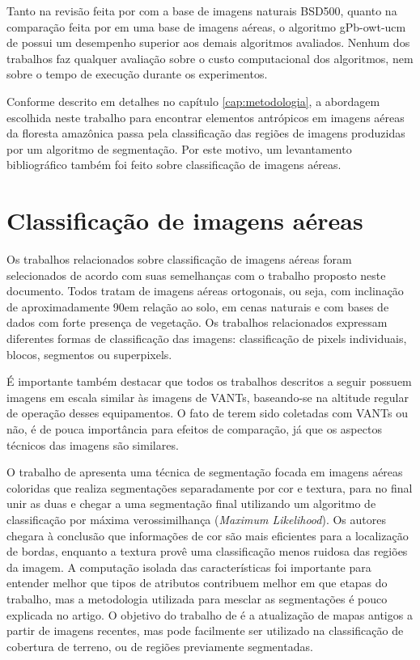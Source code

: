 Tanto na revisão feita por  com a base de imagens naturais BSD500, quanto na comparação feita por  em uma base de imagens aéreas, o algoritmo gPb-owt-ucm de  possui um desempenho superior aos demais algoritmos avaliados. Nenhum dos trabalhos faz qualquer avaliação sobre o custo computacional dos algoritmos, nem sobre o tempo de execução durante os experimentos.

Conforme descrito em detalhes no capítulo \ref{cap:metodologia}, a abordagem escolhida neste trabalho para encontrar elementos antrópicos em imagens aéreas da floresta amazônica passa pela classificação das regiões de imagens produzidas por um algoritmo de segmentação. Por este motivo, um levantamento bibliográfico também foi feito sobre classificação de imagens aéreas.

\section{Classificação de imagens aéreas}\label{sec:trClassificacao}

Os trabalhos relacionados sobre classificação de imagens aéreas foram selecionados de acordo com suas semelhanças com o trabalho proposto neste documento. Todos tratam de imagens aéreas ortogonais, ou seja, com inclinação de aproximadamente 90\degree em relação ao solo, em cenas naturais e com bases de dados com forte presença de vegetação. Os trabalhos relacionados expressam diferentes formas de classificação das imagens: classificação de pixels individuais, blocos, segmentos ou superpixels.

É importante também destacar que todos os trabalhos descritos a seguir possuem imagens em escala similar às imagens de VANTs, baseando-se na altitude regular de operação desses equipamentos. O fato de terem sido coletadas com VANTs ou não, é de pouca importância para efeitos de comparação, já que os aspectos técnicos das imagens são similares.

O trabalho de  apresenta uma técnica de segmentação focada em imagens aéreas coloridas que realiza segmentações separadamente por cor e textura, para no final unir as duas e chegar a uma segmentação final utilizando um algoritmo de classificação por máxima verossimilhança (\textit{Maximum Likelihood}). Os autores chegara à conclusão que informações de cor são mais eficientes para a localização de bordas, enquanto a textura provê uma classificação menos ruidosa das regiões da imagem. A computação isolada das características foi importante para entender melhor que tipos de atributos contribuem melhor em que etapas do trabalho, mas a metodologia utilizada para mesclar as segmentações é pouco explicada no artigo. O objetivo do trabalho de  é a atualização de mapas antigos a partir de imagens recentes, mas pode facilmente ser utilizado na classificação de cobertura de terreno, ou de regiões previamente segmentadas.


